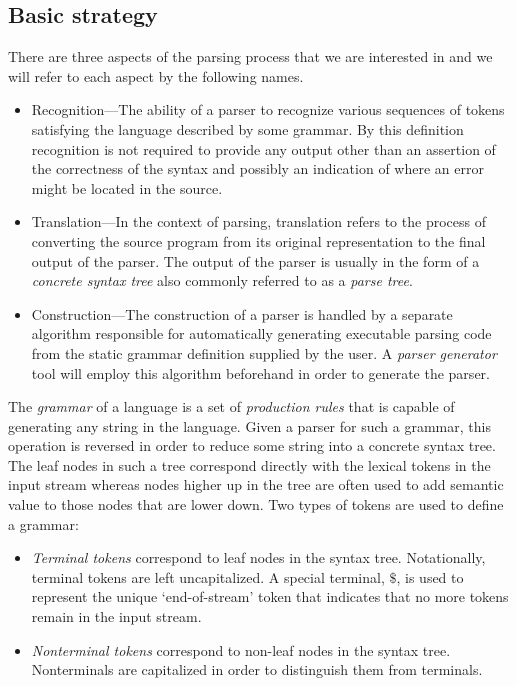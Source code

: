 \documentclass[envcountsame,runningheads]{llncs}
\begin{document}
\subsection{Basic strategy}

There are three aspects of the parsing process that we are interested in and we will refer to each aspect by the following names.
\begin{itemize}
\item Recognition---The ability of a parser to recognize various sequences of tokens satisfying the language described by some grammar. By this definition recognition is not required to provide any output other than an assertion of the correctness of the syntax and possibly an indication of where an error might be located in the source.
\item Translation---In the context of parsing, translation refers to the process of converting the source program from its original representation to the final output of the parser. The output of the parser is usually in the form of a \emph{concrete syntax tree} also commonly referred to as a \emph{parse tree}.
\item Construction---The construction of a parser is handled by a separate algorithm responsible for automatically generating executable parsing code from the static grammar definition supplied by the user. A \emph{parser generator} tool will employ this algorithm beforehand in order to generate the parser.
\end{itemize}

The \emph{grammar} of a language is a set of \emph{production rules} that is capable of generating any string in the language. 
Given a parser for such a grammar, this operation is reversed in order to reduce some string into a concrete syntax tree. 
The leaf nodes in such a tree correspond directly with the lexical tokens in the input stream whereas nodes higher up in the tree are often used to add semantic value to those nodes that are lower down.
Two types of tokens are used to define a grammar:
\begin{itemize}
\item \emph{Terminal tokens} correspond to leaf nodes in the syntax tree. Notationally, terminal tokens are left uncapitalized. A special terminal, $\$$, is used to represent the unique `end-of-stream' token that indicates that no more tokens remain in the input stream.
\item \emph{Nonterminal tokens} correspond to non-leaf nodes in the syntax tree. Nonterminals are capitalized in order to distinguish them from terminals.
\end{itemize}
\end{document}
